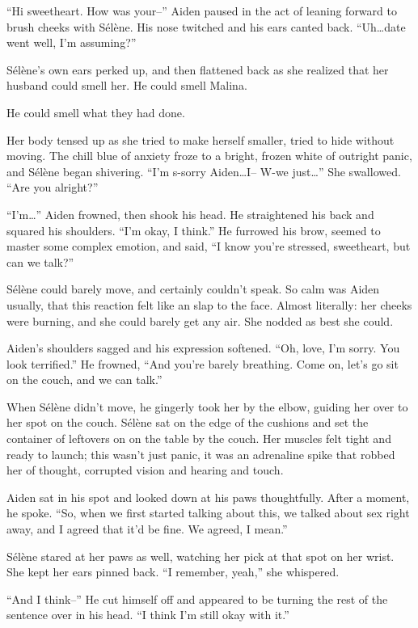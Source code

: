 ``Hi sweetheart. How was your--'' Aiden paused in the act of leaning forward to brush cheeks with Sélène. His nose twitched and his ears canted back. ``Uh\ldots{}date went well, I'm assuming?''

Sélène's own ears perked up, and then flattened back as she realized that her husband could smell her. He could smell Malina.

He could smell what they had done.

Her body tensed up as she tried to make herself smaller, tried to hide without moving. The chill blue of anxiety froze to a bright, frozen white of outright panic, and Sélène began shivering. ``I'm s-sorry Aiden\ldots{}I-- W-we just\ldots{}'' She swallowed. ``Are you alright?''

``I'm\ldots{}'' Aiden frowned, then shook his head. He straightened his back and squared his shoulders. ``I'm okay, I think.'' He furrowed his brow, seemed to master some complex emotion, and said, ``I know you're stressed, sweetheart, but can we talk?''

Sélène could barely move, and certainly couldn't speak. So calm was Aiden usually, that this reaction felt like an slap to the face. Almost literally: her cheeks were burning, and she could barely get any air. She nodded as best she could.

Aiden's shoulders sagged and his expression softened. ``Oh, love, I'm sorry. You look terrified.'' He frowned, ``And you're barely breathing. Come on, let's go sit on the couch, and we can talk.''

When Sélène didn't move, he gingerly took her by the elbow, guiding her over to her spot on the couch. Sélène sat on the edge of the cushions and set the container of leftovers on on the table by the couch. Her muscles felt tight and ready to launch; this wasn't just panic, it was an adrenaline spike that robbed her of thought, corrupted vision and hearing and touch.

Aiden sat in his spot and looked down at his paws thoughtfully. After a moment, he spoke. ``So, when we first started talking about this, we talked about sex right away, and I agreed that it'd be fine. We agreed, I mean.''

Sélène stared at her paws as well, watching her pick at that spot on her wrist. She kept her ears pinned back. ``I remember, yeah,'' she whispered.

``And I think--'' He cut himself off and appeared to be turning the rest of the sentence over in his head. ``I think I'm still okay with it.''

